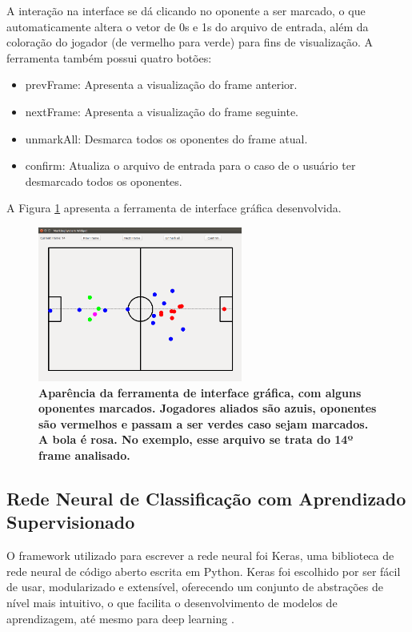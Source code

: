 \documentclass[10pt,fleqn,a4paper]{article}
\begin{document}
    A interação na interface se dá clicando no oponente a ser marcado, o que automaticamente altera o vetor de 0s e 1s do arquivo de entrada, além da coloração do jogador (de vermelho para verde) para fins de visualização. A ferramenta também possui quatro botões:
    
\begin{itemize}
\item prevFrame: Apresenta a visualização do frame anterior.
\item nextFrame: Apresenta a visualização do frame seguinte.
\item unmarkAll: Desmarca todos os oponentes do frame atual.
\item confirm: Atualiza o arquivo de entrada para o caso de o usuário ter desmarcado todos os oponentes.
\end{itemize}

A Figura \ref{fig:exemplo-interface} apresenta a ferramenta de interface gráfica desenvolvida.

\begin{figure}
\centering
\includegraphics[width=0.6\textwidth]{figures/exemplo-interface.png}
\caption{\textbf{Aparência da ferramenta de interface gráfica, com alguns oponentes marcados. Jogadores aliados são azuis, oponentes são vermelhos e passam a ser verdes caso sejam marcados. A bola é rosa. No exemplo, esse arquivo se trata do 14º frame analisado.}} \label{fig:exemplo-interface}
\end{figure}
    
    \subsection{Rede Neural de Classificação com Aprendizado Supervisionado}
    
    O framework utilizado para escrever a rede neural foi Keras, uma biblioteca de rede neural de código aberto escrita em Python. Keras foi escolhido por ser fácil de usar, modularizado e extensível, oferecendo um conjunto de abstrações de nível mais intuitivo, o que facilita o desenvolvimento de modelos de aprendizagem, até mesmo para deep learning \citep{whykeras}.
    
\end{document}
